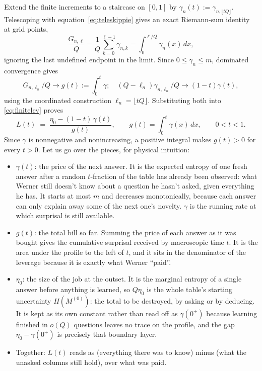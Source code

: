 \documentclass[11pt]{article}
\begin{document}
Extend the finite increments to a staircase on $[0,1]$ by
$\gamma_n(t) := \gamma_{n,\lfloor tQ\rfloor}$.
Telescoping with equation~\eqref{eq:teleskippie} gives an exact Riemann-sum identity at grid points,
%
\begin{equation}
  \frac{G_{n,\ell}}{Q}
  = \frac1Q\sum_{k=0}^{\ell-1}\gamma_{n,k}
  = \int_0^{\ell/Q}\gamma_n(x)\,dx,
  \label{eq:riemann}
\end{equation}
%
ignoring the last undefined endpoint in the limit. Since $0 \le \gamma_n \le m$, dominated convergence gives
%
\begin{equation}
G_{n,\ell_n}/Q \to g(t) := \int_0^t\gamma; \quad 
(Q-\ell_n)\gamma_{n,\ell_n}/Q \to (1-t)\gamma(t),
\end{equation}
%
using the coordinated construction $\ell_n = \lfloor tQ\rfloor$. Substituting both
into \eqref{eq:finitelev} proves
%
\begin{equation}
  L(t) \;=\; \frac{\eta_0 - (1-t)\,\gamma(t)}{g(t)},
  \qquad
  g(t) = \int_0^t \gamma(x)\,dx,
  \qquad 0 < t < 1. 
  \label{eq:master}
\end{equation}
%
Since $\gamma$ is nonnegative and nonincreasing, a positive integral
makes $g(t) > 0$ for every $t > 0$. Let us go over the pieces, for physical intuition:

\begin{itemize}
  \item $\gamma(t)$: the price of the next answer. It is the expected entropy of one fresh answer after a random $t$-fraction of the table has already been observed: what Werner still doesn't know about a question he hasn't asked, given everything he has. It starts at most $m$ and decreases monotonically, because each answer can only explain away some of the next one's novelty. $\gamma$ is the running rate at which surprisal is still available.

\item $g(t)$: the total bill so far. Summing the price of each answer as it was bought gives the cumulative surprisal received by macroscopic time $t$. It is the area under the profile to the left of $t$, and it sits in the denominator of the leverage because it is exactly what Werner ``paid''.

\item $\eta_0$: the size of the job at the outset. It is the marginal entropy of a single answer before anything is learned, so $Q \eta_0$ is the whole table's starting uncertainty $H(M^{(0)})$: the total to be destroyed, by asking or by deducing. It is kept as its own constant rather than read off as $\gamma(0^+)$ because learning finished in $o(Q)$ questions leaves no trace on the profile, and the gap $\eta_0 - \gamma(0^+)$ is precisely that boundary layer.

\item Together: $L(t)$ reads as (everything there was to know) minus (what the unasked columns still hold), over what was paid.
\end{itemize}
\end{document}
